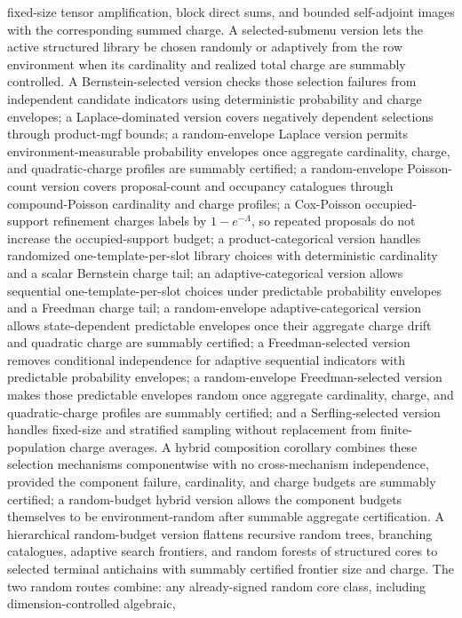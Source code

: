 \documentclass[11pt]{article}
\begin{document}
fixed-size tensor amplification, block direct sums, and bounded self-adjoint
images with the corresponding summed charge.  A selected-submenu version lets
the active structured library be chosen randomly or adaptively from the row
environment when its cardinality and realized total charge are summably
controlled.  A Bernstein-selected version checks those selection failures from
independent candidate indicators using deterministic probability and charge
envelopes; a Laplace-dominated version covers negatively dependent selections
through product-mgf bounds; a random-envelope Laplace version permits
environment-measurable probability envelopes once aggregate cardinality, charge,
and quadratic-charge profiles are summably certified; a random-envelope
Poisson-count version covers proposal-count and occupancy catalogues through
compound-Poisson cardinality and charge profiles; a Cox-Poisson
occupied-support refinement charges labels by \(1-e^{-\Lambda}\), so repeated
proposals do not increase the occupied-support budget; a product-categorical
version handles randomized one-template-per-slot library choices with
deterministic cardinality and a scalar Bernstein charge tail; an
adaptive-categorical version allows sequential
one-template-per-slot choices under predictable probability envelopes and a
Freedman charge tail; a random-envelope adaptive-categorical version allows
state-dependent predictable envelopes once their aggregate charge drift and
quadratic charge are summably certified; a Freedman-selected version removes
conditional independence for adaptive sequential indicators with predictable
probability envelopes; a random-envelope Freedman-selected version makes those
predictable envelopes random once aggregate cardinality, charge, and
quadratic-charge profiles are summably certified; and a Serfling-selected
version handles fixed-size and stratified sampling without replacement from
finite-population charge averages.  A hybrid composition corollary combines
these selection mechanisms componentwise with no cross-mechanism independence,
provided the component failure, cardinality, and charge budgets are summably
certified; a random-budget hybrid version allows the component budgets
themselves to be environment-random after summable aggregate certification.
A hierarchical random-budget version flattens recursive random trees, branching
catalogues, adaptive search frontiers, and random forests of structured cores
to selected terminal antichains with summably certified frontier size and
charge.
The two
random routes combine:
any already-signed random core class, including dimension-controlled algebraic,
\end{document}
